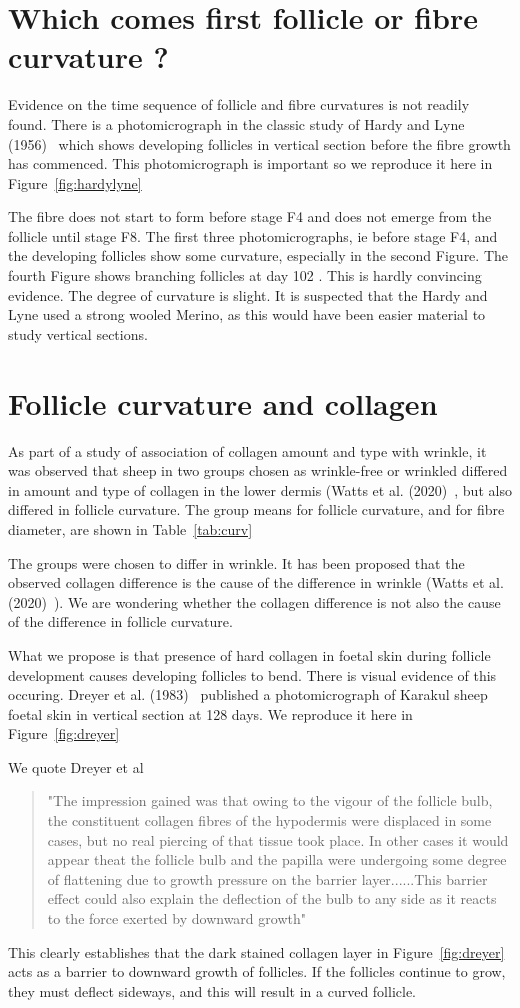 \documentclass{article}
\begin{document}
\section{Which comes first follicle or fibre curvature ?}
Evidence on the time sequence of follicle and fibre curvatures is not readily found. There is a photomicrograph in the classic study of Hardy and Lyne (1956)~\cite{hardy-1956} which shows developing follicles in vertical section before the fibre growth has commenced. This photomicrograph is important so we reproduce it here in Figure~\ref{fig:hardylyne}

The fibre does not start to form before stage F4 and does not emerge from the follicle until stage F8. The first three photomicrographs, ie before stage F4, and the developing follicles show some curvature, especially in the second Figure. The fourth Figure shows branching follicles at day 102 .
This is hardly convincing evidence. The degree of curvature is slight. It is suspected that the Hardy and Lyne used a strong wooled Merino, as this would have been easier material to study vertical sections. 

\section{Follicle curvature and collagen}
As part of a study of association of collagen amount and type with wrinkle, it was observed that sheep in two groups chosen as wrinkle-free or wrinkled differed in amount and type of collagen in the lower dermis (Watts et al. (2020)~\cite{watts-2020}, but also differed in follicle curvature.  The group means for follicle curvature, and for fibre diameter, are shown in Table~\ref{tab:curv}

The groups were chosen to differ in wrinkle. It has been proposed that the observed collagen difference is the cause of the difference in wrinkle (Watts et al. (2020)~\cite{watts-2020}). We are wondering whether the collagen difference is not also the cause of the difference in follicle curvature. 

What we propose is that presence of hard collagen in foetal skin during follicle development causes developing follicles to bend.  There is visual evidence of this occuring. Dreyer et al. (1983)~\cite{dreyer-1983} published a photomicrograph of Karakul sheep foetal skin in vertical section at 128 days. We reproduce it here in Figure~\ref{fig:dreyer}

We quote Dreyer et al
\begin{quote}
"The impression gained was that owing to the vigour of the follicle bulb, the constituent collagen fibres of the hypodermis were displaced in some cases, but no real piercing of that tissue took place. In other cases it would appear theat the follicle bulb and the papilla were undergoing some degree of flattening due to growth pressure on the barrier layer......This barrier effect could also explain the deflection of the bulb to any side as it reacts to the force exerted by downward growth"
\end{quote}
This clearly establishes that the dark stained collagen layer in Figure~\ref{fig:dreyer} acts as a barrier to downward growth of follicles.  If the follicles continue to grow, they must deflect sideways, and this will result in a curved follicle.
\end{document}
